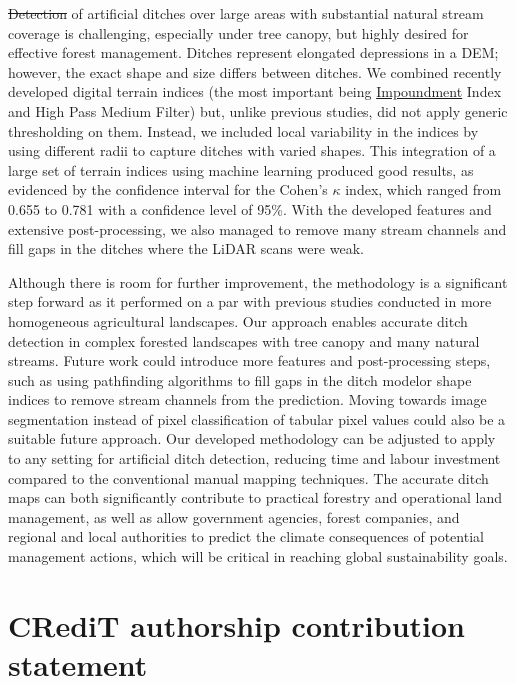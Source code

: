 \documentclass[11pt, review]{elsarticle} %
\providecommand{\DIFaddtex}[1]{{\protect\color{blue}\uwave{#1}}} %
\providecommand{\DIFdeltex}[1]{{\protect\color{red}\sout{#1}}}                      %
\providecommand{\DIFaddbegin}{} %
\providecommand{\DIFaddend}{} %
\providecommand{\DIFdelbegin}{} %
\providecommand{\DIFdelend}{} %
\providecommand{\DIFadd}[1]{\texorpdfstring{\DIFaddtex{#1}}{#1}} %
\providecommand{\DIFdel}[1]{\texorpdfstring{\DIFdeltex{#1}}{}} %
\begin{document}
\DIFdelbegin \DIFdel{Detection }\DIFdelend \DIFaddbegin \DIFadd{The detection }\DIFaddend of artificial ditches over large areas with substantial natural stream coverage is challenging, especially under tree canopy, but highly desired for effective forest management. Ditches represent elongated depressions in a DEM; however, the exact shape and size differs between ditches. We combined recently developed digital terrain indices (the most important being \hyperref[impoundment]{Impoundment} Index and High Pass Medium Filter) but, unlike previous studies, did not apply generic thresholding on them. Instead, we included local variability in the indices by using different radii to capture ditches with varied shapes. This integration of a large set of terrain indices using machine learning produced good results, as evidenced by the confidence interval for the Cohen's $\kappa$ index, which ranged from 0.655 to 0.781 with a confidence level of 95\%. With the developed features and extensive post-processing, we also managed to remove many stream channels and fill gaps in the ditches where the LiDAR scans were weak. 

Although there is room for further improvement, the methodology is a significant step forward as it performed on a par with previous studies conducted in more homogeneous agricultural landscapes. Our approach enables accurate ditch detection in complex forested landscapes with tree canopy and many natural streams. Future work could introduce more features and post-processing steps, such as using pathfinding algorithms to fill gaps in the ditch model\DIFaddbegin \DIFadd{, }\DIFaddend or shape indices to remove stream channels from the prediction. Moving towards image segmentation instead of pixel classification of tabular pixel values could also be a suitable future approach. Our developed methodology can be adjusted to apply to any setting for artificial ditch detection, reducing time and labour investment compared to the conventional manual mapping techniques. The accurate ditch maps can both significantly contribute to practical forestry and operational land management, as well as allow government agencies, forest companies, and regional and local authorities to predict the climate consequences of potential management actions, which will be critical in reaching global sustainability goals.

\section*{CRediT authorship contribution statement}
\end{document}
